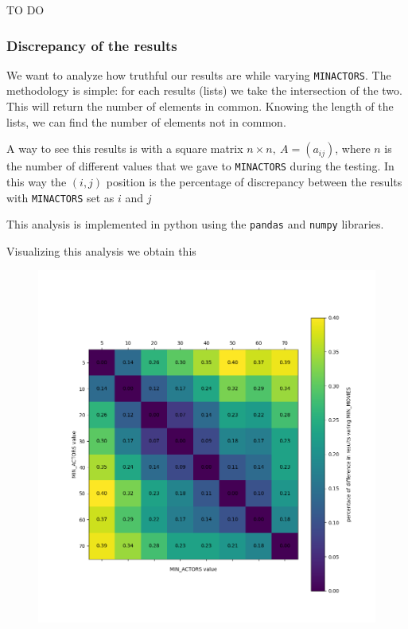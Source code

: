TO DO

\subsubsection{Discrepancy of the results}
We want to analyze how truthful our results are while varying \texttt{MIN\textunderscore ACTORS}. The methodology is simple: for each results (lists) we take the intersection of the two. This will return the number of elements in common. Knowing the length of the lists, we can find the number of elements not in common. \s

\nd A way to see this results is with a square matrix $n \times n, ~ A = (a_{ij})$, where $n$ is the number of different values that we gave to \texttt{MIN\textunderscore ACTORS} during the testing. In this way the $(i,j)$ position is the percentage of discrepancy between the results with \texttt{MIN\textunderscore ACTORS} set as $i$ and $j$ \s

\nd This analysis is implemented in python using the \texttt{pandas} and \texttt{numpy} libraries.



\nd Visualizing this analysis we obtain this

\begin{figure}[h]
    \includegraphics[width=13cm]{Figure_1.png}
\end{figure}

